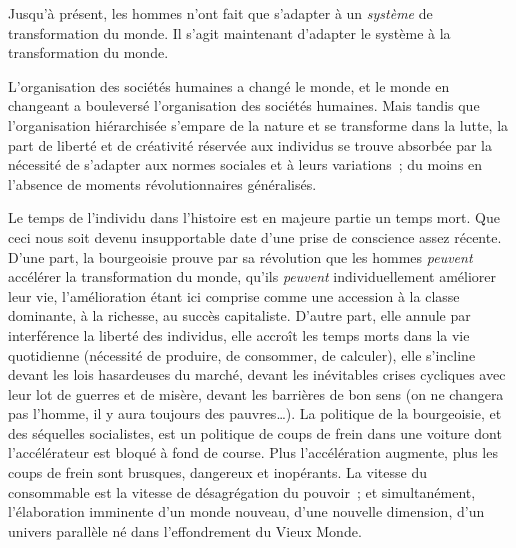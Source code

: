 \documentclass[french,twoside]{book} %
\begin{document}
\noindent Jusqu’à présent, les hommes n’ont fait que s’adapter à un \emph{système} de transformation du monde. Il s’agit maintenant d’adapter le système à la transformation du monde.\par
L’organisation des sociétés humaines a changé le monde, et le monde en changeant a bouleversé l’organisation des sociétés humaines. Mais tandis que l’organisation hiérarchisée s’empare de la nature et se transforme dans la lutte, la part de liberté et de créativité réservée aux individus se trouve absorbée par la nécessité de s’adapter aux normes sociales et à leurs variations ; du moins en l’absence de moments révolutionnaires généralisés.\par
Le temps de l’individu dans l’histoire est en majeure partie un temps mort. Que ceci nous soit devenu insupportable date d’une prise de conscience assez récente. D’une part, la bourgeoisie prouve par sa révolution que les hommes \emph{peuvent} accélérer la transformation du monde, qu’ils \emph{peuvent} individuellement améliorer leur vie, l’amélioration étant ici comprise comme une accession à la classe dominante, à la richesse, au succès capitaliste. D’autre part, elle annule par interférence la liberté des individus, elle accroît les temps morts dans la vie quotidienne (nécessité de produire, de consommer, de calculer), elle s’incline devant les lois hasardeuses du marché, devant les inévitables crises cycliques avec leur lot de guerres et de misère, devant les barrières de bon sens (on ne changera pas l’homme, il y aura toujours des pauvres…). La politique de la bourgeoisie, et des séquelles socialistes, est un politique de coups de frein dans une voiture dont l’accélérateur est bloqué à fond de course. Plus l’accélération augmente, plus les coups de frein sont brusques, dangereux et inopérants. La vitesse du consommable est la vitesse de désagrégation du pouvoir ; et simultanément, l’élaboration imminente d’un monde nouveau, d’une nouvelle dimension, d’un univers parallèle né dans l’effondrement du Vieux Monde.\par
\end{document}
